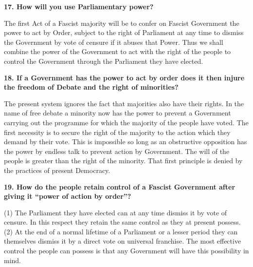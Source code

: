 \documentclass{book}
\begin{document}
\begin{flushright}
\textbf{17. How will you use Parliamentary power?}

The first Act of a Fascist majority will be to confer on Fascist Government the power to act by
Order, subject to the right of Parliament at any time to dismiss the Government by vote of
censure if it abuses that Power. Thus we shall combine the power of the Government to act with the right of the people to control the
Government through the Parliament they have elected.
\end{flushright}


\begin{flushleft}
\textbf{18. If a Government has the power to act by order does it
    then injure the freedom of Debate and the right of minorities?}

The present system ignores the fact that majorities also have their rights. In the name of free
debate a minority now has the power to prevent a Government carrying out the programme for
which the majority of the people have voted. The first necessity is to secure the right of the
majority to the action which they demand by their vote. This is impossible so long as an
obstructive opposition has the power by endless talk to prevent action by Government. The will
of the people is greater than the right of the minority. That first principle is denied by the practices of present Democracy.
\end{flushleft}


\begin{flushright}
\textbf{19. How do the people retain control of a Fascist Government after giving it ``power of
action by order''?}

(1) The Parliament they have elected can at any time dismiss it by vote of censure. In this respect
they retain the same control as they at present possess.
(2) At the end of a normal lifetime of a Parliament or a lesser period they can themselves dismiss
it by a direct vote on universal franchise. The most effective control the people can possess is that any Government will have this possibility in mind.
\end{flushright}
\end{document}
